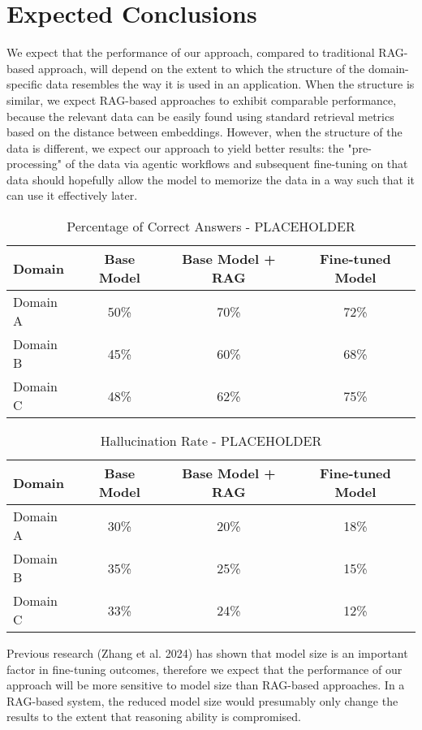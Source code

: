 \section{Expected Conclusions}

We expect that the performance of our approach, compared to traditional RAG-based approach, will depend on the extent to which the structure of the domain-specific data resembles the way it is used in an application. When the structure is similar, we expect RAG-based approaches to exhibit comparable performance, because the relevant data can be easily found using standard retrieval metrics based on the distance between embeddings. However, when the structure of the data is different, we expect our approach to yield better results: the "pre-processing" of the data via agentic workflows and subsequent fine-tuning on that data should hopefully allow the model to memorize the data in a way such that it can use it effectively later.


\begin{table}[ht]
    \centering
    \begin{tabular}{|l|c|c|c|}
        \hline
        \textbf{Domain} & \textbf{Base Model} & \textbf{Base Model + RAG} & \textbf{Fine-tuned Model} \\ \hline
        Domain A & 50\% & 70\% & 72\% \\ \hline
        Domain B & 45\% & 60\% & 68\% \\ \hline
        Domain C & 48\% & 62\% & 75\% \\ \hline
    \end{tabular}
    \caption{Percentage of Correct Answers - PLACEHOLDER}
\end{table}

\begin{table}[ht]
    \centering
    \begin{tabular}{|l|c|c|c|}
        \hline
        \textbf{Domain} & \textbf{Base Model} & \textbf{Base Model + RAG} & \textbf{Fine-tuned Model} \\ \hline
        Domain A & 30\% & 20\% & 18\% \\ \hline
        Domain B & 35\% & 25\% & 15\% \\ \hline
        Domain C & 33\% & 24\% & 12\% \\ \hline
    \end{tabular}
    \caption{Hallucination Rate - PLACEHOLDER}
\end{table}


Previous research (Zhang et al. 2024) has shown that model size is an important factor in fine-tuning outcomes, therefore we expect that the performance of our approach will be more sensitive to model size than RAG-based approaches. In a RAG-based system, the reduced model size would presumably only change the results to the extent that reasoning ability is compromised.

